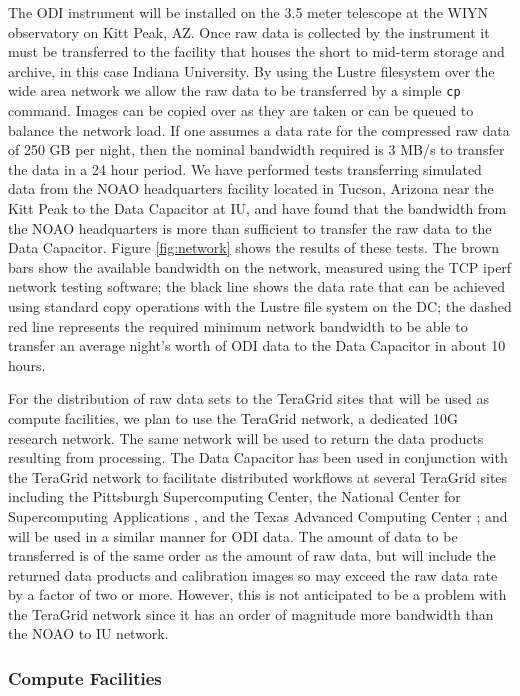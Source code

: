 \documentclass[10pt,conference]{IEEEtran}
\begin{document}
The ODI instrument will be installed on the 3.5 meter telescope at the WIYN observatory on Kitt Peak, AZ. Once raw data is collected by the instrument it must be transferred to the facility that houses the short to mid-term storage and archive, in this case Indiana University. By using the Lustre filesystem over the wide area network we allow the raw data to be transferred by a simple {\tt cp} command. Images can be copied over as they are taken or can be queued to balance the network load. If one assumes a data rate for the compressed raw data of 250 GB per night, then the nominal bandwidth required is 3 MB/s to transfer the data in a 24 hour period. We have performed tests transferring simulated data from the NOAO headquarters facility located in Tucson, Arizona near the Kitt Peak to the Data Capacitor at IU, and have found that the bandwidth from the NOAO headquarters is more than sufficient to transfer the raw data to the Data Capacitor. Figure \ref{fig:network} shows the results of these tests. The brown bars show the available bandwidth on the network, measured using the TCP iperf network testing software; the black line shows the data rate that can be achieved using standard copy operations with the Lustre file system on the DC; the dashed red line represents the required minimum network bandwidth to be able to transfer an average night's worth of ODI data to
the Data Capacitor in about 10 hours.

For the distribution of raw data sets to the TeraGrid sites that will be used as compute facilities, we plan to use the TeraGrid network, a dedicated 10G research network. The same network will be used to return the data products resulting from processing. The Data Capacitor has been used in conjunction with the TeraGrid network to facilitate distributed workflows at several TeraGrid sites including the Pittsburgh Supercomputing Center, the National Center for Supercomputing Applications \cite{henschel2010}, and the Texas Advanced Computing Center \cite{horowitz2010}; and will be used in a similar manner for ODI data. The amount of data to be transferred is of the same order as the amount of raw data, but will include the returned data products and calibration images so may exceed the raw data rate by a factor of two or more. However, this is not anticipated to be a problem with the TeraGrid network since it has an order of magnitude more bandwidth than the NOAO to IU network.

\subsubsection{Compute Facilities}
\end{document}
